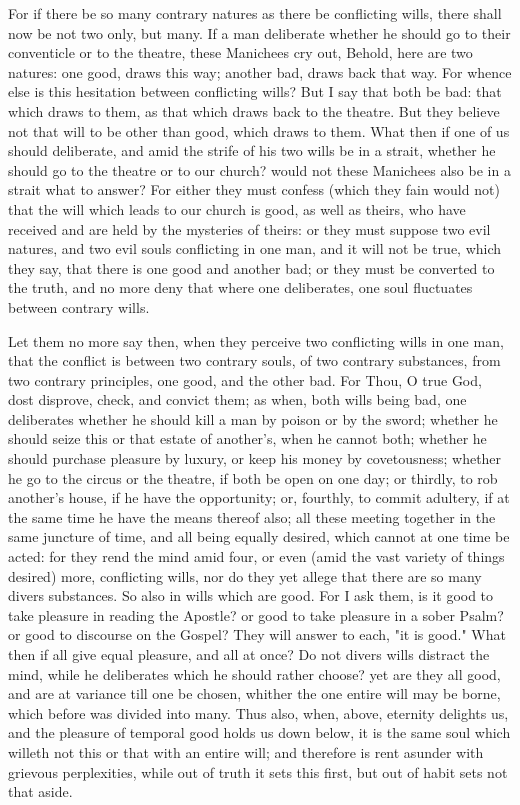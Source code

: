 \documentclass[b5paper,openright,12pt,twoside]{book}
\begin{document}
For if there be so many contrary natures as there be conflicting wills,
there shall now be not two only, but many. If a man deliberate whether
he should go to their conventicle or to the theatre, these Manichees
cry out, Behold, here are two natures: one good, draws this way; another
bad, draws back that way. For whence else is this hesitation between
conflicting wills? But I say that both be bad: that which draws to them,
as that which draws back to the theatre. But they believe not that
will to be other than good, which draws to them. What then if one of us
should deliberate, and amid the strife of his two wills be in a strait,
whether he should go to the theatre or to our church? would not these
Manichees also be in a strait what to answer? For either they must
confess (which they fain would not) that the will which leads to our
church is good, as well as theirs, who have received and are held by the
mysteries of theirs: or they must suppose two evil natures, and two evil
souls conflicting in one man, and it will not be true, which they say,
that there is one good and another bad; or they must be converted to the
truth, and no more deny that where one deliberates, one soul fluctuates
between contrary wills.

Let them no more say then, when they perceive two conflicting wills
in one man, that the conflict is between two contrary souls, of two
contrary substances, from two contrary principles, one good, and the
other bad. For Thou, O true God, dost disprove, check, and convict them;
as when, both wills being bad, one deliberates whether he should kill
a man by poison or by the sword; whether he should seize this or that
estate of another's, when he cannot both; whether he should purchase
pleasure by luxury, or keep his money by covetousness; whether he go to
the circus or the theatre, if both be open on one day; or thirdly, to
rob another's house, if he have the opportunity; or, fourthly, to commit
adultery, if at the same time he have the means thereof also; all these
meeting together in the same juncture of time, and all being equally
desired, which cannot at one time be acted: for they rend the mind
amid four, or even (amid the vast variety of things desired) more,
conflicting wills, nor do they yet allege that there are so many divers
substances. So also in wills which are good. For I ask them, is it good
to take pleasure in reading the Apostle? or good to take pleasure in
a sober Psalm? or good to discourse on the Gospel? They will answer to
each, "it is good." What then if all give equal pleasure, and all at
once? Do not divers wills distract the mind, while he deliberates which
he should rather choose? yet are they all good, and are at variance till
one be chosen, whither the one entire will may be borne, which before
was divided into many. Thus also, when, above, eternity delights us, and
the pleasure of temporal good holds us down below, it is the same soul
which willeth not this or that with an entire will; and therefore is
rent asunder with grievous perplexities, while out of truth it sets this
first, but out of habit sets not that aside.
\end{document}
